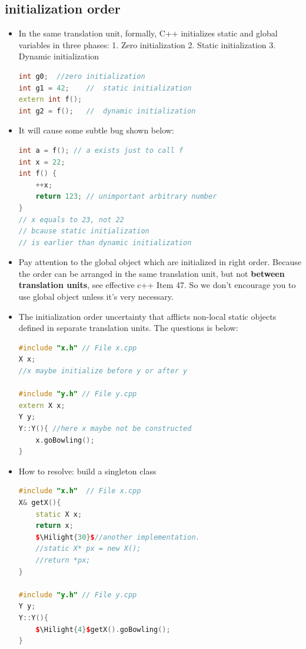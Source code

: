 \documentclass[a4paper,12pt,twoside]{book}
\newcommand{\Hilight}[1]{\makebox[0pt][l]{\color{yellow}\rule[-3pt]{#1em}{11pt}}}
\begin{document}
\subsection{initialization order}
\begin{itemize}
	\item In the same translation unit, formally, C++ initializes static and global variables in three phases: 1. Zero initialization 2. Static initialization 3. Dynamic initialization
	
\begin{lstlisting}[frame=single, language=c++, mathescape=true]
int g0;  //zero initialization
int g1 = 42;    //  static initialization
extern int f();
int g2 = f();   //  dynamic initialization
\end{lstlisting}
	\item It will cause some subtle bug shown below:
\begin{lstlisting}[frame=single, language=c++, mathescape=true]
int a = f(); // a exists just to call f
int x = 22;
int f() {
	++x;
	return 123; // unimportant arbitrary number
}
// x equals to 23, not 22
// bcause static initialization
// is earlier than dynamic initialization
\end{lstlisting}
	
	\item Pay attention to the global object which are initialized in right order. Because the order can be arranged in the same translation unit, but not \textbf{between translation units}, see effective c++ Item 47. So we don't encourage you to use global object unless it's very necessary.
	
	\item The initialization order uncertainty that afflicts non-local static objects defined in separate translation units. The questions is below:
	
\begin{lstlisting}[frame=single, language=c++]
#include "x.h" // File x.cpp
X x;
//x maybe initialize before y or after y
	
#include "y.h" // File y.cpp
extern X x;
Y y;
Y::Y(){ //here x maybe not be constructed
	x.goBowling();
}
\end{lstlisting}
	
	\item  How to resolve: build a singleton class
	\begin{lstlisting}[frame=single, language=c++, mathescape=true]
#include "x.h"  // File x.cpp
X& getX(){
	static X x;
	return x;
	$\Hilight{30}$//another implementation.
	//static X* px = new X();
	//return *px;
}
	
#include "y.h" // File y.cpp
Y y;
Y::Y(){
	$\Hilight{4}$getX().goBowling();
}
\end{lstlisting}
\end{itemize}
\end{document}
